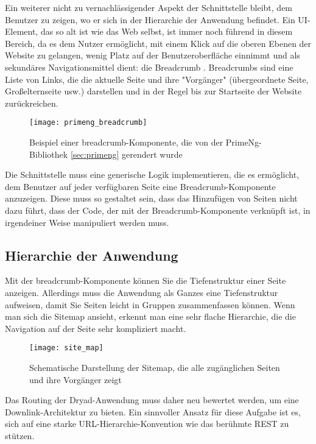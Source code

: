 Ein weiterer nicht zu vernachlässigender Aspekt der Schnittstelle bleibt, dem Benutzer zu zeigen, wo er sich in der Hierarchie der Anwendung befindet.
Ein UI-Element, das so alt ist wie das Web selbst, ist immer noch führend in diesem Bereich, da es dem Nutzer ermöglicht, mit einem Klick auf die oberen Ebenen der Website zu gelangen, wenig Platz auf der Benutzeroberfläche einnimmt und als sekundäres Navigationsmittel dient: die Breadcrumb \cite{breadcrumb}.
Breadcrumbs sind eine Liste von Links, die die aktuelle Seite und ihre "Vorgänger" (übergeordnete Seite, Großelternseite usw.) darstellen und in der Regel bis zur Startseite der Website zurückreichen.

\begin{figure}[H]
  \centering
  \texttt{[image: primeng\_breadcrumb]}
  \caption{Beispiel einer breadcrumb-Komponente, die von der PrimeNg-Bibliothek \ref{sec:primeng} gerendert wurde}
  \label{fig:primeng_breadcrumb}
\end{figure}

Die Schnittstelle muss eine generische Logik implementieren, die es ermöglicht, dem Benutzer auf jeder verfügbaren Seite eine Breadcrumb-Komponente anzuzeigen.
Diese muss so gestaltet sein, dass das Hinzufügen von Seiten nicht dazu führt, dass der Code, der mit der Breadcrumb-Komponente verknüpft ist, in irgendeiner Weise manipuliert werden muss.

\subsection{Hierarchie der Anwendung}

Mit der breadcrumb-Komponente können Sie die Tiefenstruktur einer Seite anzeigen.
Allerdings muss die Anwendung als Ganzes eine Tiefenstruktur aufweisen, damit Sie Seiten leicht in Gruppen zusammenfassen können.
Wenn man sich die Sitemap ansieht, erkennt man eine sehr flache Hierarchie, die die Navigation auf der Seite sehr kompliziert macht.

\begin{figure}[H]
  \centering
  \texttt{[image: site\_map]}
  \caption{Schematische Darstellung der Sitemap, die alle zugänglichen Seiten und ihre Vorgänger zeigt}
  \label{fig:site_map}
\end{figure}

Das Routing der Dryad-Anwendung muss daher neu bewertet werden, um eine Downlink-Architektur zu bieten.
Ein sinnvoller Ansatz für diese Aufgabe ist es, sich auf eine starke URL-Hierarchie-Konvention wie das berühmte \ac{REST} zu stützen.

